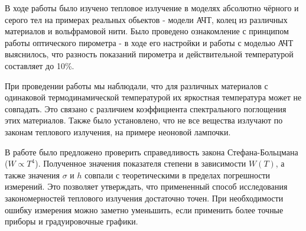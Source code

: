 В ходе работы было изучено тепловое излучение в моделях абсолютно чёрного и серого тел на примерах реальных обьектов - модели АЧТ, колец из различных материалов и вольфрамовой нити. Было проведено ознакомление с принципом работы оптического пирометра - в ходе его настройки и работы с моделью АЧТ выяснилось, что разность показаний пирометра и действительной температурой составляет до 10\%. 

При проведении работы мы наблюдали, что для различных материалов с одинаковой термодинамической температурой их яркостная температура может не совпадать. Это связано с различием коэффициента спектрального поглощения этих материалов. Также было установлено, что не все вещества излучают по законам теплового излучения, на примере неоновой лампочки.

В работе было предложено проверить справедливость закона Стефана-Больцмана ($W \propto T^4$). Полученное значения показателя степени в зависимости $W(T)$, а также значения $\sigma$ и $h$ совпали с теоретическими в пределах погрешности измерений. Это позволяет утверждать, что примененный способ исследования закономерностей теплового излучения достаточно точен. При необходимости ошибку измерения можно заметно уменьшить, если применить более точные приборы и градуировочные графики.